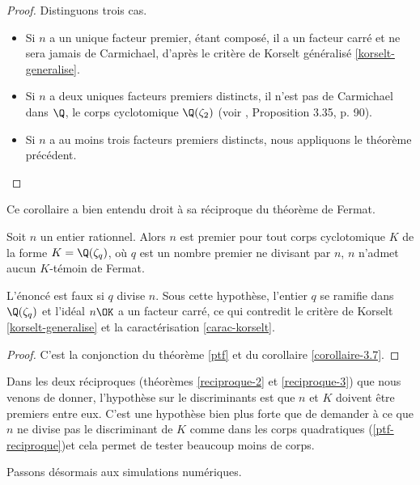 \begin{proof}
	Distinguons trois cas.
	\begin{itemize}
		\item Si $n$ a un unique facteur premier, étant composé, il a un facteur carré et ne sera jamais de Carmichael, d'après le critère de Korselt généralisé \ref{korselt-generalise}.
		\item Si $n$ a deux uniques facteurs premiers distincts, il n'est pas de Carmichael dans $\Q$, le corps cyclotomique $\Q(\zeta_2)$ (voir \cite{Demazure}, Proposition 3.35, p. 90).
		\item Si $n$ a au moins trois facteurs premiers distincts, nous appliquons le théorème précédent.
	\end{itemize}
\end{proof}

Ce corollaire a bien entendu droit à sa réciproque du théorème de Fermat.

\begin{theoreme}\label{reciproque-3}
	Soit $n$ un entier rationnel. Alors $n$ est premier \ssi pour tout corps cyclotomique $K$ de la forme $K = \Q(\zeta_q)$, où $q$ est un nombre premier ne divisant par $n$, $n$ n'admet aucun $K$-témoin de Fermat.
\end{theoreme}

\begin{remarque}
	L'énoncé est faux si $q$ divise $n$. Sous cette hypothèse, l'entier $q$ se ramifie dans $\Q(\zeta_q)$ et l'idéal $n\OK$ a un facteur carré, ce qui contredit le critère de Korselt \ref{korselt-generalise} et la caractérisation \ref{carac-korselt}.
\end{remarque}

\begin{proof}
	C'est la conjonction du théorème \ref{ptf} et du corollaire \ref{corollaire-3.7}.
\end{proof}

\begin{remarque}
	Dans les deux réciproques (théorèmes \ref{reciproque-2} et \ref{reciproque-3}) que nous venons de donner, l'hypothèse sur le discriminants est que $n$ et $K$ doivent être premiers entre eux. C'est une hypothèse bien plus forte que de demander à ce que $n$ ne divise pas le discriminant de $K$ comme dans les corps quadratiques (\ref{ptf-reciproque})et cela permet de tester beaucoup moins de corps.
\end{remarque}

Passons désormais aux simulations numériques.


